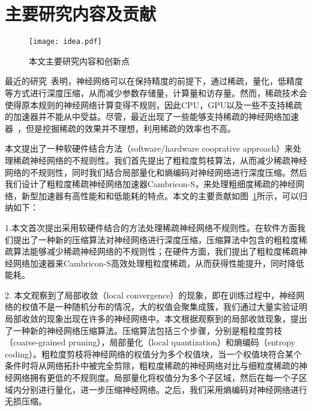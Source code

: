 

\section{主要研究内容及贡献}

\begin{figure}[ht]
\centering
\texttt{[image: idea.pdf]}
\caption{本文主要研究内容和创新点}
\label{fig:idea}
\end{figure}

最近的研究~\cite{han2015learning,han2015deep,wang2016cnnpack,zhou2017incremental}表明，神经网络可以在保持精度的前提下，通过稀疏，量化，低精度等方式进行深度压缩，从而减少参数存储量，计算量和访存量。然而，稀疏技术会使得原本规则的神经网络计算变得不规则，因此CPU，GPU以及一些不支持稀疏的加速器并不能从中受益。尽管，最近出现了一些能够支持稀疏的神经网络加速器~\cite{chen2017eyeriss,zhang2016cambricon,albericio2016cnvlutin,han2016eie,han2017ese,angshuman2017scnn}，但是挖掘稀疏的效果并不理想，利用稀疏的效率也不高。

本文提出了一种软硬件结合方法（software/hardware cooprative approach）来处理稀疏神经网络的不规则性。我们首先提出了粗粒度剪枝算法，从而减少稀疏神经网络的不规则性，同时我们结合局部量化和熵编码对神经网络进行深度压缩。然后我们设计了粗粒度稀疏神经网络加速器Cambricon-S，来处理粗细度稀疏的神经网络，新型加速器有高性能和和低能耗的特点。本文的主要贡献如图~\ref{fig:idea}所示，可以归纳如下：

1.本文首次提出采用软硬件结合的方法处理稀疏神经网络不规则性。在软件方面我们提出了一种新的压缩算法对神经网络进行深度压缩，压缩算法中包含的粗粒度稀疏算法能够减少稀疏神经网络的不规则性；在硬件方面，我们提出了粗粒度稀疏神经网络加速器来Cambricon-S高效处理粗粒度稀疏，从而获得性能提升，同时降低能耗。

2. 本文观察到了局部收敛（local convergence）的现象，即在训练过程中，神经网络的权值不是一种随机分布的情况，大的权值会聚集成簇，我们通过大量实验证明局部收敛的现象出现在许多的神经网络中。本文根据观察到的局部收敛现象，提出了一种新的神经网络压缩算法。压缩算法包括三个步骤，分别是粗粒度剪枝（coarse-grained pruning），局部量化（local quantization）和熵编码（entropy coding）。粗粒度剪枝将神经网络的权值分为多个权值块，当一个权值块符合某个条件时将从网络拓扑中被完全剪除，粗粒度稀疏的神经网络对比与细粒度稀疏的神经网络拥有更低的不规则度。局部量化将权值分为多个子区域，然后在每一个子区域内分别进行量化，进一步压缩神经网络。之后，我们采用熵编码对神经网络进行无损压缩。

